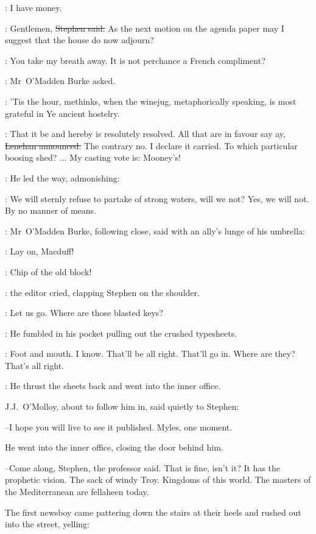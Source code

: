 \StephenInt:
I have money.

\Stephen:
Gentlemen,
\sout{Stephen said.}
As the next motion on the agenda paper
may I suggest that the house do now adjourn?

\omaddenburke:
You take my breath away.
It is not perchance a French compliment?

:
Mr~O'Madden Burke asked.

\omaddenburke:
'Tis the hour,
methinks,
when the winejug,
metaphorically speaking,
is most grateful in Ye ancient hostelry.

\lenehan:
That it be and hereby is resolutely resolved.
All that are in favour
say ay,
\sout{Lenehan announced.}
The contrary no.
I declare it carried.
To which particular boosing shed? ...
My casting vote is:
Mooney's!


:
He led the way,
admonishing:

\lenehan:
We will sternly refuse to partake of strong waters,
will we not?
Yes, we will not.
By no manner of means.


:
Mr~O'Madden Burke,
following close,
said with an ally's lunge of his umbrella:

\omaddenburke:
Lay on, Macduff!

\crawford:
Chip of the old block!

:
the editor cried,
clapping Stephen on the shoulder.

\crawford:
Let us go.
Where are those blasted keys?

:
He fumbled in his pocket
pulling out the crushed typesheets.

\crawford:
Foot and mouth.
I know.
That'll be all right.
That'll go in.
Where are they?
That's all right.

:
He thrust the sheets back
and went into the inner office.



J.J.~O'Molloy,
about to follow him in,
said quietly to Stephen:

--I hope you will live to see it published.
Myles, one moment.

He went into the inner office,
closing the door behind him.

--Come along, Stephen,
the professor said.
That is fine, isn't it?
It has the prophetic vision.
The sack of windy Troy.
Kingdoms of this world.
The masters of the Mediterranean are fellaheen today.

The first newsboy came pattering down the stairs at their heels
and rushed out into the street,
yelling:

